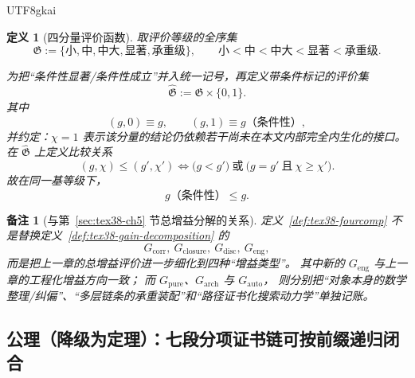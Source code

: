\documentclass[12pt]{article}
\newtheorem{definition}{定义}[section]
\newtheorem{remark}{备注}[section]
\begin{document}
\begin{CJK*}{UTF8}{gkai}
\begin{definition}[四分量评价函数]
取评价等级的全序集
\[
  \mathfrak G
  :=
  \{
    \text{小},
    \text{中},
    \text{中大},
    \text{显著},
    \text{承重级}
  \},
  \qquad
  \text{小}
  <
  \text{中}
  <
  \text{中大}
  <
  \text{显著}
  <
  \text{承重级}.
\]

为把“条件性显著/条件性成立”并入统一记号，再定义带条件标记的评价集
\[
  \widehat{\mathfrak G}:=\mathfrak G\times\{0,1\}.
\]
其中
\[
  (g,0)\equiv g,
  \qquad
  (g,1)\equiv g\text{（条件性）},
\]
并约定：$\chi=1$ 表示该分量的结论仍依赖若干尚未在本文内部完全内生化的接口。
在 $\widehat{\mathfrak G}$ 上定义比较关系
\[
  (g,\chi)\le (g',\chi')
  \Longleftrightarrow
  \bigl(g<g'\bigr)
  \ \text{或}\
  \bigl(g=g'\ \text{且}\ \chi\ge\chi'\bigr).
\]
故在同一基等级下，
\[
  g\text{（条件性）}\le g.
\]
\end{definition}

\begin{remark}[与第~\ref{sec:tex38-ch5} 节总增益分解的关系]
定义~\ref{def:tex38-fourcomp} 不是替换定义~\ref{def:tex38-gain-decomposition} 的
\[
  G_{\mathrm{corr}},\
  G_{\mathrm{closure}},\
  G_{\mathrm{disc}},\
  G_{\mathrm{eng}},
\]
而是把上一章的总增益评价进一步细化到四种“增益类型”。
其中新的 $G_{\mathrm{eng}}$ 与上一章的工程化增益方向一致；
而 $G_{\mathrm{pure}}$、$G_{\mathrm{arch}}$ 与 $G_{\mathrm{auto}}$，
则分别把“对象本身的数学整理/纠偏”、“多层链条的承重装配”和“路径证书化搜索动力学”单独记账。
\end{remark}

\subsection{公理（降级为定理）：七段分项证书链可按前缀递归闭合}
\label{subsec:tex38-fourcomp-axiom}


\end{CJK*}
\end{document}
